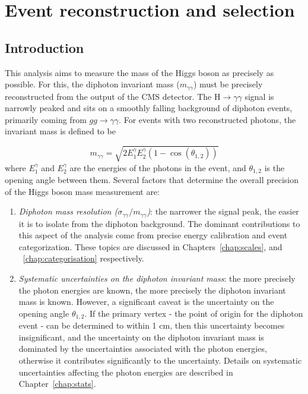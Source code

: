 \chapter{Event reconstruction and selection}
\label{chap:reco}
\section{Introduction}

This analysis aims to measure the mass of the Higgs boson as precisely as possible. For this, the diphoton invariant mass ($m_{\gamma\gamma}$) must be precisely reconstructed from the output of the CMS detector. The H$\rightarrow\gamma\gamma$ signal is narrowly peaked and sits on a smoothly falling background of diphoton events, primarily coming from $gg\rightarrow\gamma\gamma$. For events with two reconstructed photons, the invariant mass is defined to be

\begin{equation}
    m_{\gamma\gamma} = \sqrt{2 E_{1}^{\gamma} E_{2}^{\gamma}(1-\cos(\theta_{1,2}))}
    \label{eqn:mgg}
\end{equation}
where $E_1^{\gamma}$ and $E_2^{\gamma}$ are the energies of the photons in the event, and $\theta_{1,2}$ is the opening angle between them. Several factors that determine the overall precision of the Higgs boson mass measurement are:
\begin{enumerate}
    \item \textit{Diphoton mass resolution ($\sigma_{\gamma\gamma}/m_{\gamma\gamma}$)}: the narrower the signal peak, the easier it is to isolate from the diphoton background. The dominant contributions to this aspect of the analysis come from precise energy calibration and event categorization. These topics are discussed in Chapters~\ref{chap:scales}, and ~\ref{chap:categorisation} respectively.
    \item \textit{Systematic uncertainties on the diphoton invariant mass}: the more precisely the photon energies are known, the more precisely the diphoton invariant mass is known. However, a significant caveat is the uncertainty on the opening angle $\theta_{1,2}$. If the primary vertex - the point of origin for the diphoton event - can be determined to within 1 cm, then this uncertainty becomes insignificant, and the uncertainty on the diphoton invariant mass is dominated by the uncertainties associated with the photon energies, otherwise it contributes significantly to the uncertainty. Details on systematic uncertainties affecting the photon energies are described in Chapter~\ref{chap:stats}. 
\end{enumerate}

